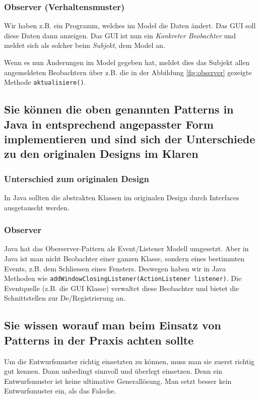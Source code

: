 
\newpage

\subsubsection{Observer (Verhaltensmuster)}
Wir haben z.B. ein Programm, welches im Model die Daten ändert. Das GUI soll diese Daten dann anzeigen. Das GUI ist nun ein \emph{Konkreter Beobachter} und meldet sich als solcher beim \emph{Subjekt}, dem Model an.

Wenn es nun Änderungen im Model gegeben hat, meldet dies das Subjekt allen angemeldeten Beobachtern über z.B. die in der Abbildung \ref{fig:observer} gezeigte Methode \texttt{aktualisiere()}.



\subsection{Sie können die oben genannten Patterns in Java in entsprechend angepasster Form implementieren und sind sich der Unterschiede zu den originalen Designs im Klaren}

\subsubsection{Unterschied zum originalen Design}
In Java sollten die abstrakten Klassen im originalen Design durch Interfaces ausgetauscht werden.

\subsubsection{Observer}
Java hat das Oberserver-Pattern als Event/Listener Modell umgesetzt. Aber in Java ist man nicht Beobachter einer ganzen Klasse, sondern eines bestimmten Events, z.B. dem Schliessen eines Fensters. Deswegen haben wir in Java Methoden wie \texttt{addWindowClosingListener(ActionListener listener)}. Die Eventquelle (z.B. die GUI Klasse) verwaltet diese Beobachter und bietet die Schnittstellen zur De/Registrierung an.

\subsection{Sie wissen worauf man beim Einsatz von Patterns in der Praxis achten sollte}
Um die Entwurfsmuster richtig einsetzten zu können, muss man sie zuerst richtig gut kennen. Dann unbedingt sinnvoll und überlegt einsetzen. Denn ein Entwurfsmuster ist keine ultimative Generallösung. Man setzt besser kein Entwurfsmuster ein, als das Falsche.

